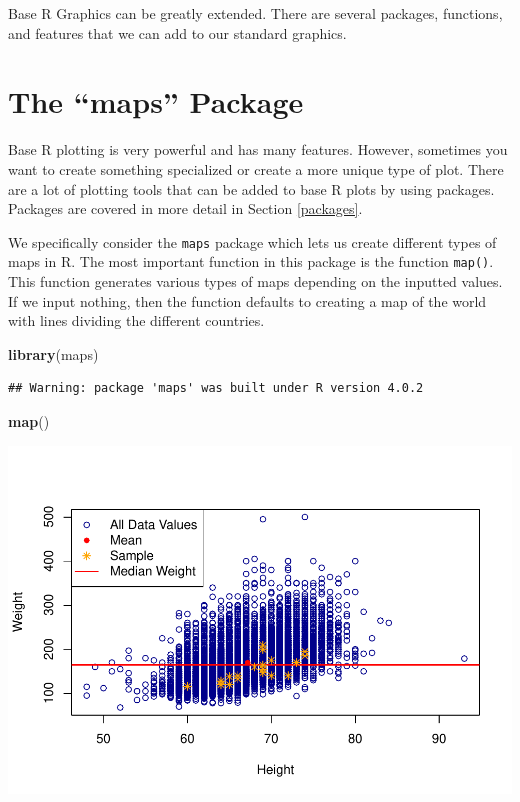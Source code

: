 \documentclass[
]{book}
\newenvironment{Shaded}{\begin{snugshade}}{\end{snugshade}}
\newcommand{\KeywordTok}[1]{\textcolor[rgb]{0.13,0.29,0.53}{\textbf{#1}}}
\newcommand{\NormalTok}[1]{#1}
\begin{document}
Base R Graphics can be greatly extended. There are several packages, functions, and features that we can add to our standard graphics.

\hypertarget{the-maps-package}{%
\section{The ``maps'' Package}\label{the-maps-package}}

Base R plotting is very powerful and has many features. However, sometimes you want to create something specialized or create a more unique type of plot. There are a lot of plotting tools that can be added to base R plots by using packages. Packages are covered in more detail in Section \ref{packages}.

We specifically consider the \texttt{maps} package which lets us create different types of maps in R. The most important function in this package is the function \texttt{map()}. This function generates various types of maps depending on the inputted values. If we input nothing, then the function defaults to creating a map of the world with lines dividing the different countries.

\begin{Shaded}
\begin{Highlighting}[]
\KeywordTok{library}\NormalTok{(maps)}
\end{Highlighting}
\end{Shaded}

\begin{verbatim}
## Warning: package 'maps' was built under R version 4.0.2
\end{verbatim}

\begin{Shaded}
\begin{Highlighting}[]
\KeywordTok{map}\NormalTok{()}
\end{Highlighting}
\end{Shaded}

\includegraphics{_main_files/figure-latex/unnamed-chunk-192-1.pdf}
\end{document}
